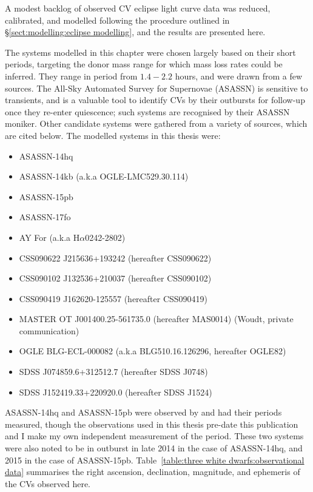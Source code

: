 \label{chpt:characterisation of 12 new CVs} %

A modest backlog of observed CV eclipse light curve data was reduced, calibrated, and modelled following the procedure outlined in \S\ref{sect:modelling:eclipse modelling}, and the results are presented here.

The systems modelled in this chapter were chosen largely based on their short periods, targeting the donor mass range for which mass loss rates could be inferred. They range in period from $1.4 - 2.2$ hours, and were drawn from a few sources.
The All-Sky Automated Survey for Supernovae (ASASSN) \citep{shappee2014} is sensitive to transients, and is a valuable tool to identify CVs by their outbursts for follow-up once they re-enter quiescence; such systems are recognised by their ASASSN moniker.
Other candidate systems were gathered from a variety of sources, which are cited below.
The modelled systems in this thesis were:
\begin{itemize}
    \setlength\itemsep{0em}
    \item ASASSN-14hq
    \item ASASSN-14kb (a.k.a OGLE-LMC529.30.114)
    \item ASASSN-15pb
    \item ASASSN-17fo
    \item AY For (a.k.a H$\alpha$0242-2802) \citep{woudt2004}
    \item CSS090622 J215636+193242 (hereafter CSS090622) \citep{kato2012,thorstensen2016}
    \item CSS090102 J132536+210037 (hereafter CSS090102) \citep{kato2012}
    \item CSS090419 J162620-125557 (hereafter CSS090419) \citep{kato2012}
    \item MASTER OT J001400.25-561735.0 (hereafter MAS0014) (Woudt, private communication)
    \item OGLE BLG-ECL-000082 (a.k.a BLG510.16.126296, hereafter OGLE82) \citep{soszynski2016}
    \item SDSS J074859.6+312512.7 (hereafter SDSS J0748) \citep{kato2016}
    \item SDSS J152419.33+220920.0 (hereafter SDSS J1524) \citep{southworth2010,michel2013}
\end{itemize}
\newpage
ASASSN-14hq and ASASSN-15pb were observed by \citet{paterson2019} and had their periods measured, though the observations used in this thesis pre-date this publication and I make my own independent measurement of the period.
These two systems were also noted to be in outburst in late 2014 in the case of ASASSN-14hq, and 2015 in the case of ASASSN-15pb.
Table~\ref{table:three white dwarfs:observational data} summarises the right ascension, declination, magnitude, and ephemeris of the CVs observed here.

